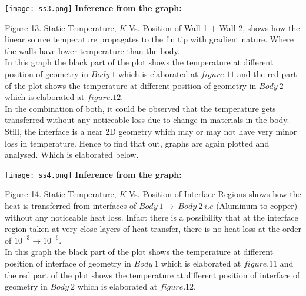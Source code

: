 \documentclass{article}
\begin{document}
\begin{center}
    \texttt{[image: ss3.png]}
    \vspace{2cm}
    \textbf{Inference from the graph: }
    \vspace{1cm}
\end{center}
Figure 13. Static Temperature, $K$ Vs. Position of Wall 1 $+$ Wall 2, shows how the linear source temperature propagates to the fin tip with gradient nature. Where the walls have lower temperature than the body. 
\vspace{1cm}\\
In this graph the black part of the plot shows the temperature at different position of geometry in $Body\ 1$ which is elaborated at $figure. 11$ and the red part of the plot shows  the temperature at different position of geometry in $Body\ 2$ which is elaborated at $figure. 12$.\\ In the combination of both, it could be observed that the temperature gets transferred without any noticeable loss due to change in materials in the body. 
\vspace{1cm}\\
Still, the interface is a near 2D geometry which may or may not have very minor loss in temperature. Hence to find that out, graphs are again plotted and analysed. Which is elaborated below. 
\begin{center}
    \texttt{[image: ss4.png]}
    \vspace{1.5cm}
    \textbf{Inference from the graph: }
    \vspace{1cm}
\end{center}
Figure 14. Static Temperature, $K$ Vs. Position of Interface Regions shows how the heat is transferred from interfaces of $Body\ 1 \rightarrow\ Body\ 2\ i.e$ (Aluminum to copper) without any noticeable heat loss. Infact there is a possibility that at the interface region taken at very close layers of heat transfer, there is no heat loss at the order of $10^{-3} \rightarrow 10^{-6}$.
\vspace{1cm}\\
In this graph the black part of the plot shows the temperature at different position of interface of geometry in $Body\ 1$ which is elaborated at $figure. 11$ and the red part of the plot shows  the temperature at different position of interface of geometry in $Body\ 2$ which is elaborated at $figure. 12$.
\end{document}
